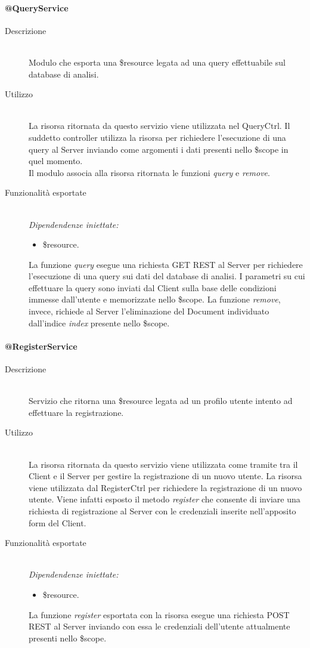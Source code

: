 \paragraph{@QueryService}
\begin{description}
 \item[Descrizione] \hfill \\
 Modulo che esporta una \$resource legata ad una query effettuabile sul database di analisi.
 \item[Utilizzo] \hfill \\
 La risorsa ritornata da questo servizio viene utilizzata nel QueryCtrl. Il suddetto controller utilizza la risorsa per richiedere l'esecuzione 
 di una query al Server inviando come argomenti i dati presenti nello \$scope in quel momento. \\
 Il modulo associa alla risorsa ritornata le funzioni \textit{query} e \textit{remove}.
 \item[Funzionalità esportate] \hfill \\
 \emph{Dipendendenze iniettate:}
 \begin{itemize}
  \item \$resource.
 \end{itemize}
 La funzione \textit{query} esegue una richiesta GET REST al Server per richiedere l'esecuzione di una query sui dati del database di analisi. 
 I parametri su cui effettuare la query sono inviati dal Client sulla base delle condizioni immesse dall'utente e memorizzate nello \$scope.
 La funzione \textit{remove}, invece, richiede al Server l'eliminazione del Document individuato dall'indice \textit{index} presente nello \$scope. 
\end{description}

\paragraph{@RegisterService}
\begin{description}
 \item[Descrizione] \hfill \\
 Servizio che ritorna una \$resource legata ad un profilo utente intento ad effettuare la registrazione. 
 \item[Utilizzo] \hfill \\
 La risorsa ritornata da questo servizio viene utilizzata come tramite tra il Client e il Server per gestire la registrazione di un nuovo utente. 
 La risorsa viene utilizzata dal RegisterCtrl per richiedere la registrazione di un nuovo utente. Viene infatti esposto il metodo \textit{register} 
 che consente di inviare una richiesta di registrazione al Server con le credenziali inserite nell'apposito form del Client. 
 \item[Funzionalità esportate] \hfill \\
 \emph{Dipendendenze iniettate:}
 \begin{itemize}
  \item \$resource.
 \end{itemize}
 La funzione \textit{register} esportata con la risorsa esegue una richiesta POST REST al Server inviando con essa le credenziali dell'utente 
 attualmente presenti nello \$scope.
\end{description}


